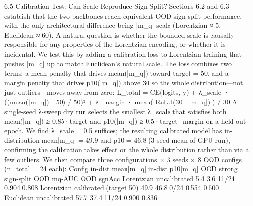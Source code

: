 6.5 Calibration Test: Can Scale Reproduce Sign-Split?
Sections 6.2 and 6.3 establish that the two backbones reach equivalent OOD sign-split performance, with the only architectural difference being |m_q| scale (Lorentzian ≈ 5, Euclidean ≈ 60). A natural question is whether the bounded scale is causally responsible for any properties of the Lorentzian encoding, or whether it is incidental.
We test this by adding a calibration loss to Lorentzian training that pushes |m_q| up to match Euclidean's natural scale. The loss combines two terms: a mean penalty that drives mean(|m_q|) toward target = 50, and a margin penalty that drives p10(|m_q|) above 30 so the whole distribution—not just outliers—moves away from zero:
L_total = CE(logits, y)
        + λ_scale · ((mean(|m_q|) - 50) / 50)²
        + λ_margin · mean( ReLU(30 - |m_q|) ) / 30
A single-seed λ-sweep dry run selects the smallest λ_scale that satisfies both mean(|m_q|) ≥ 0.85·target and p10(|m_q|) ≥ 0.5·target_margin on a held-out epoch. We find λ_scale = 0.5 suffices; the resulting calibrated model has in-distribution mean|m_q| = 49.9 and p10 = 46.8 (3-seed mean of GPU run), confirming the calibration takes effect on the whole distribution rather than via a few outliers.
We then compare three configurations × 3 seeds × 8 OOD configs (n_total = 24 each):
Config
in-dist mean|m_q|
in-dist p10|m_q|
OOD strong sign-split
OOD mq-AUC
OOD sgnAcc
Lorentzian uncalibrated
5.4
3.6
11/24
0.904
0.808
Lorentzian calibrated (target 50)
49.9
46.8
0/24
0.554
0.500
Euclidean uncalibrated
57.7
37.4
11/24
0.900
0.836

